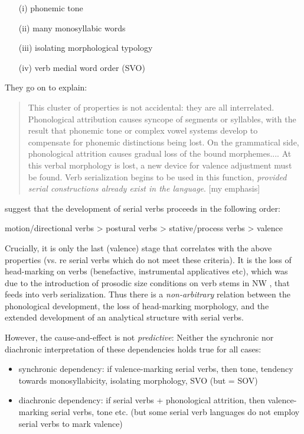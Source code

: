 \documentclass[output=paper]{langsci/langscibook}
\begin{document}
\begin{itemize}
 \item [(i)]  phonemic tone  
 \item [(ii)]  many monosyllabic words   
 \item [(iii)]  isolating morphological typology 
 \item [(iv)]  verb medial word order (SVO)
\end{itemize}


They go on to explain:
\begin{quote}
This cluster of properties is not accidental: they are all interrelated. Phonological attribution causes syncope of segments or syllables, with the result that phonemic tone or complex vowel systems develop to compensate for phonemic distinctions being lost. On the grammatical side, phonological attrition causes gradual loss of the bound morphemes.... At this verbal morphology is lost, a new device for valence adjustment must be found. Verb serialization begins to be used in this function, \textit{provided serial constructions already exist in the language}. \citep[51]{Foley1985} [my emphasis]
\end{quote}


 \citeauthor{Foley1985} suggest that the development of serial verbs proceeds in the following order:

\ea  motion/directional verbs {\textgreater} postural verbs {\textgreater} stative/process verbs {\textgreater} valence
\z

Crucially, it is only the last (valence) stage that correlates with the above properties (vs. \citeauthor{Crowley2002} \citeyear{Crowley2002} re  serial verbs which do not meet these criteria). It is the loss of head-marking on verbs (benefactive, instrumental applicatives etc), which was due to the introduction of prosodic size conditions on verb stems in NW  \citep{Hyman2004}, that feeds into verb serialization. Thus there is a \textit{non-arbitrary} relation between the phonological development, the loss of head-marking morphology, and the extended development of an analytical structure with serial verbs.

    However, the cause-and-effect is not \textit{predictive}: Neither the synchronic nor diachronic interpretation of these dependencies holds true for all cases:

\begin{itemize}
  \item synchronic dependency:  if valence-marking serial verbs, then tone, tendency towards monosyllabicity, isolating morphology, SVO (but  = SOV)

  \item   diachronic dependency:  if serial verbs + phonological attrition, then va\-lence-marking serial verbs, tone etc. (but some serial verb languages do not employ serial verbs to mark valence)

\end{itemize}
\end{document}
